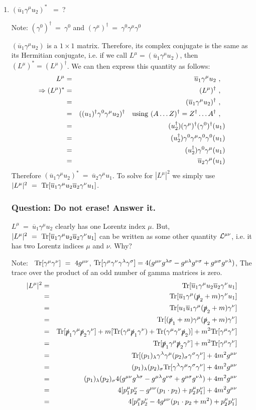 \documentclass[12pt]{article}
\def \bea{\begin{eqnarray}}
\def \eea{\end{eqnarray}}
\def \Tr{{\rm Tr}}
\def \nn{\nonumber}
\def \nl{\nn \\}
\def \ou{\overline{u}}
\def \ga{\gamma}
\def \la{\lambda}
\def \si{\sigma}
\def \cgr{\color{green}}
\begin{document}
\begin{enumerate}

\item$(\ou_1\ga^\mu u_2)^*$ ~=~?

Note: $(\ga^0)^\dag~=~\ga^0$ and $(\ga^\mu)^\dag~=~ \ga^0\ga^\mu\ga^0$

$(\ou_1\ga^\mu u_2)$ is a $1\times1$ matrix. Therefore, its complex conjugate is the same as its Hermitian conjugate, i.e. if we call
$L^\mu = (\ou_1\ga^\mu u_2)$, then $(L^\mu)^* = (L^\mu)^\dag$. We can then express this quantity as follows:
\bea
L^\mu &=& \ou_1\ga^\mu u_2 ~,~~ \nl
\Rightarrow (L^\mu)^* &=& (L^\mu)^\dag ~,~~ \nl
&=& (\ou_1\ga^\mu u_2)^\dag ~,~~ \nl
&=& ((u_1)^\dag\ga^0\ga^\mu u_2)^\dag ~~~{\rm using}~(A\ldots Z)^\dag = Z^\dag\ldots A^\dag ~,~~ \nl
&=& (u_2^\dag)(\ga^\mu)^\dag(\ga^0)^\dag(u_1)\nl
&=& (u_2^\dag)\ga^0\ga^\mu\ga^0\ga^0(u_1)\nl
&=& (u_2^\dag)\ga^0\ga^\mu(u_1)\nl
&=& \ou_2\ga^\mu(u_1)
\eea
Therefore $(\ou_1\ga^\mu u_2)^*~=~\ou_2\ga^\mu u_1 $. To solve for $|L^\mu|^2$ we simply use $|L^\mu|^2 ~=~ \Tr[\ou_1 \ga^\mu u_2 \ou_2 \ga^\nu u_1]$.


\subsubsection*{Question: Do not erase! Answer it.}
{\cgr $L^\mu ~=~ \ou_1\ga^\mu u_2$ clearly has one Lorentz index $\mu$. But, $|L^\mu|^2 ~=~ \Tr[\ou_1 \ga^\mu u_2 \ou_2 \ga^\nu u_1]$ can be written as some other quantity ${\cal L}^{\mu\nu}$, i.e. it has two Lorentz indices $\mu$ and $\nu$. Why?}

\bigskip
Note: ~$\Tr[\ga^\mu\ga^\nu]~=~4 g^{\mu\nu}$, $\Tr[\ga^\mu \ga^\nu \ga^\la \ga^\si]= 4(g^{\mu\nu}g^{\la\si} - g^{\mu\la} g^{\nu\si} + g^{\mu\si}g^{\nu\la})$, The trace over the product of an odd number of gamma matrices is zero.
\bea
|L^{\mu}|^2 &=& \Tr[\ou_1 \ga^\mu u_2 \ou_2 \ga^\nu u_1] \nl
&=& \Tr[\ou_1 \ga^\mu (\slashed{p}_2+m) \ga^\nu u_1]\nl
&=& \Tr[u_1\ou_1 \ga^\mu (\slashed{p}_2+m) \ga^\nu]\nl
&=& \Tr[(\slashed{p}_1+m) \ga^\mu (\slashed{p}_2+m) \ga^\nu]\nl
&=& \Tr[\slashed{p}_1\ga^\mu \slashed{p}_2 \ga^\nu] + m[\Tr(\ga^\mu \slashed{p}_1\ga^\nu) + \Tr(\ga^\mu \ga^\nu \slashed{p}_2)] + m^2\Tr[\ga^\mu \ga^\nu]\nl
&=& \Tr[\slashed{p}_1\ga^\mu \slashed{p}_2 \ga^\nu] + m^2\Tr[\ga^\mu \ga^\nu]\nl
&=& \Tr[(p_1)_\la\ga^\la \ga^\mu (p_2)_\si\ga^\si \ga^\nu  ] + 4m^2g^{\mu\nu}\nl
&=& (p_1)_\la (p_2)_\si \Tr[\ga^\la \ga^\mu\ga^\si \ga^\nu  ] + 4m^2g^{\mu\nu}\nl
&=& (p_1)_\la(p_2)_\si 4(g^{\mu\nu}g^{\la\si} - g^{\mu\la} g^{\nu\si} + g^{\mu\si}g^{\nu\la}) + 4m^2g^{\mu\nu}\nl
&=& 4[p_1^\mu p_2^\nu - g^{\mu\nu}(p_1 \cdot p_2) + p_2^\mu p_1^\nu] + 4m^2g^{\mu\nu} \nl
&=& 4[p_1^\mu p_2^\nu - 4g^{\mu\nu}(p_1 \cdot p_2 + m^2) + p_2^\mu p_1^\nu]
\eea


\end{enumerate}
\end{document}
